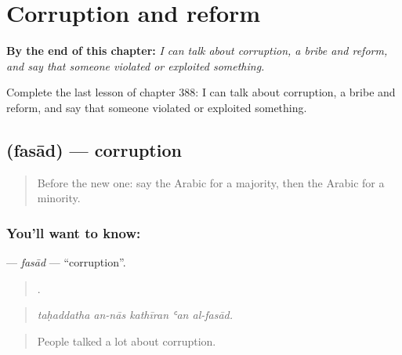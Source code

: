 
\chapter{Corruption and reform}
\label{ch:ar-corruption-and-reform}

\begin{chapteropening}
\textbf{By the end of this chapter:} \emph{I can talk about corruption, a bribe and reform, and say that someone violated or exploited something.}

Complete the last lesson of chapter 388: I can talk about corruption, a bribe and reform, and say that someone violated or exploited something.
\end{chapteropening}

\section[\texorpdfstring{\ar{فساد} (fasād)}{فساد (fasād)}]{ (fasād) — corruption}

\label{lesson:AR-C388-fasad}



\begin{quote}
Before the new one: say the Arabic for a majority, then the Arabic for a minority.
\end{quote}

\subsection*{You'll want to know: }
\textbf{} — \emph{fasād} — \textquotedblleft{}corruption\textquotedblright{}.

\begin{quote}
    .
\end{quote}

\begin{quote}
\emph{taḥaddatha an-nās kathīran ʿan al-fasād.}
\end{quote}

\begin{quote}
People talked a lot about corruption.
\end{quote}

